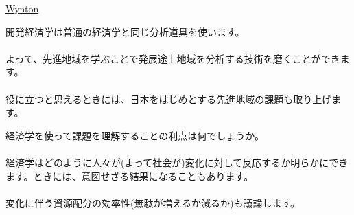 \begin{frame}{}
\hfil\href{https://wyntonmarsalis.org/images/press/TwoMenWithTheBlues_cover_back.jpg}{Wynton}
\end{frame}


\begin{frame}{}
開発経済学は普通の経済学と同じ分析道具を使います。\\~\\

よって、先進地域を学ぶことで発展途上地域を分析する技術を磨くことができます。\\~\\

役に立つと思えるときには、日本をはじめとする先進地域の課題も取り上げます。\\
\end{frame}

\begin{frame}{}
経済学を使って課題を理解することの利点は何でしょうか。\\~\\
\pause
経済学はどのように人々が(よって社会が)変化に対して反応するか明らかにできます。ときには、意図せざる結果になることもあります。\\~\\
\pause
変化に伴う資源配分の効率性(無駄が増えるか減るか)も議論します。
\end{frame}

